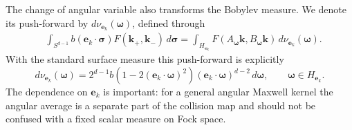 \documentclass[11pt,oneside]{article}
\numberwithin{equation}{section}
\theoremstyle{definition}
\begin{document}
The change of angular variable also transforms the Bobylev measure.  We denote its push-forward by $d\nu_{\bm e_k}(\bm\omega)$, defined through
\begin{equation}
\begin{aligned}
&\int_{S^{d-1}}
 b(\bm e_k\!\cdot\!\bm\sigma)
 F(\bm k_+,\bm k_-)
 \,d\bm\sigma
=
\int_{H_{\bm e_k}}
F(A_{\bm\omega}\bm k,B_{\bm\omega}\bm k)
\,d\nu_{\bm e_k}(\bm\omega) .
\end{aligned}
\label{eq:maxwell_pushforward_measure_def}
\end{equation}
With the standard surface measure this push-forward is explicitly
\begin{equation}
 d\nu_{\bm e_k}(\bm\omega)
 =
 2^{d-1}
 b\!\left(1-2(\bm e_k\cdot\bm\omega)^2\right)
 (\bm e_k\cdot\bm\omega)^{d-2}
 \,d\bm\omega,
 \qquad \bm\omega\in H_{\bm e_k}.
\label{eq:maxwell_pushforward_measure_explicit}
\end{equation}
The dependence on $\bm e_k$ is important: for a general angular Maxwell kernel the angular average is a separate part of the collision map and should not be confused with a fixed scalar measure on Fock space.
\end{document}
